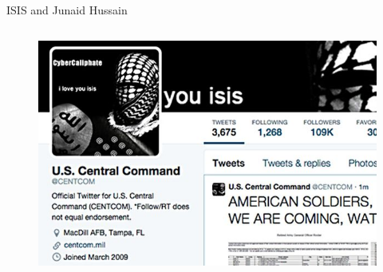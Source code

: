 \documentclass[nobackground,dvipsnames,table]{beamer}
\begin{document}
\begin{frame}{ISIS and Junaid Hussain}
\begin{columns}
\begin{figure}
                \centering
                \includegraphics[width=\textwidth]{isis-twitter-hack}
            \end{figure}
    \end{columns}
\end{frame}
\end{document}
